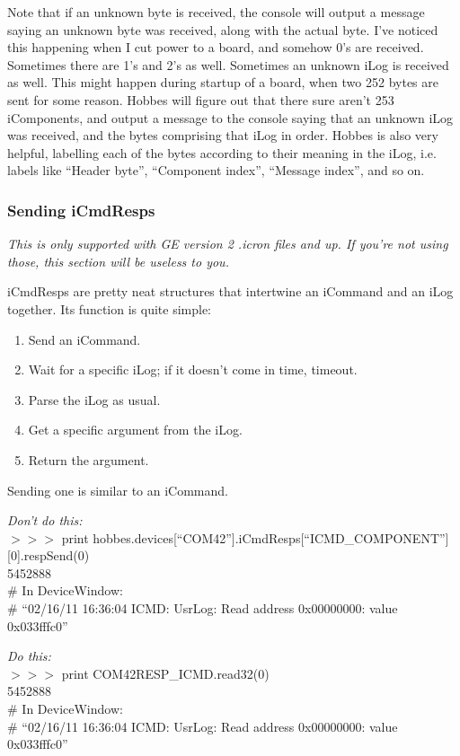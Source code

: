 Note that if an unknown byte is received, the console will output a message saying an unknown byte was received, along with the actual byte. I've noticed this happening when I cut power to a board, and somehow 0's are received. Sometimes there are 1's and 2's as well. Sometimes an unknown iLog is received as well. This might happen during startup of a board, when two 252 bytes are sent for some reason. Hobbes will figure out that there sure aren't 253 iComponents, and output a message to the console saying that an unknown iLog was received, and the bytes comprising that iLog in order. Hobbes is also very helpful, labelling each of the bytes according to their meaning in the iLog, i.e. labels like ``Header byte'', ``Component index'', ``Message index'', and so on.



%
%
\subsubsection{Sending iCmdResps}
\label{3.2.6}

\emph{This is only supported with GE version 2 .icron files and up. If you're not using those, this section will be useless to you.}

iCmdResps are pretty neat structures that intertwine an iCommand and an iLog together. Its function is quite simple:

\begin{enumerate}
\item Send an iCommand.
\item Wait for a specific iLog; if it doesn't come in time, timeout.
\item Parse the iLog as usual.
\item Get a specific argument from the iLog.
\item Return the argument.
\end{enumerate}

Sending one is similar to an iCommand.

\noindent \emph{Don't do this:} \\ $>>>$ print hobbes.devices[``COM42''].iCmdResps[``ICMD\_COMPONENT''][0].respSend(0) \\ 5452888 \\ \# In DeviceWindow: \\ \# ``02/16/11 16:36:04 ICMD: UsrLog: Read address 0x00000000: value 0x033fffc0''
\vspace{12pt}

\noindent \emph{Do this:} \\ $>>>$ print COM42RESP\_ICMD.read32(0) \\ 5452888 \\ \# In DeviceWindow: \\ \# ``02/16/11 16:36:04 ICMD: UsrLog: Read address 0x00000000: value 0x033fffc0''
\vspace{12pt}


